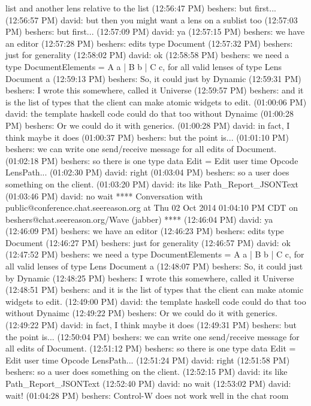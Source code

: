 list and another lens relative to the list
(12:56:47 PM) beshers: but first...
(12:56:57 PM) david: but then you might want a lens on a sublist too
(12:57:03 PM) beshers: but first...
(12:57:09 PM) david: ya
(12:57:15 PM) beshers: we have an editor
(12:57:28 PM) beshers: edits type Document
(12:57:32 PM) beshers: just for generality
(12:58:02 PM) david: ok
(12:58:58 PM) beshers: we need a type DocumentElements = A a | B b | C c, for
all valid lenses of type Lens Document a
(12:59:13 PM) beshers: So, it could just by Dynamic
(12:59:31 PM) beshers: I wrote this somewhere, called it Universe
(12:59:57 PM) beshers: and it is the list of types that the client can make
atomic widgets to edit.
(01:00:06 PM) david: the template haskell code could do that too without
Dynaimc
(01:00:28 PM) beshers: Or we could do it with generics.
(01:00:28 PM) david: in fact, I think maybe it does
(01:00:37 PM) beshers: but the point is...
(01:01:10 PM) beshers: we can write one send/receive message for all edits of
Document.
(01:02:18 PM) beshers: so there is one type data Edit = Edit user time Opcode
LensPath...
(01:02:30 PM) david: right
(01:03:04 PM) beshers: so a user does something on the client.
(01:03:20 PM) david: its like Path_Report_JSONText
(01:03:46 PM) david: no wait
**** Conversation with public@conference.chat.seereason.org at Thu 02 Oct 2014
01:04:10 PM CDT on beshers@chat.seereason.org/Wave (jabber) ****
(12:46:04 PM) david: ya
(12:46:09 PM) beshers: we have an editor
(12:46:23 PM) beshers: edits type Document
(12:46:27 PM) beshers: just for generality
(12:46:57 PM) david: ok
(12:47:52 PM) beshers: we need a type DocumentElements = A a | B b | C c, for
all valid lenses of type Lens Document a
(12:48:07 PM) beshers: So, it could just by Dynamic
(12:48:25 PM) beshers: I wrote this somewhere, called it Universe
(12:48:51 PM) beshers: and it is the list of types that the client can make
atomic widgets to edit.
(12:49:00 PM) david: the template haskell code could do that too without
Dynaimc
(12:49:22 PM) beshers: Or we could do it with generics.
(12:49:22 PM) david: in fact, I think maybe it does
(12:49:31 PM) beshers: but the point is...
(12:50:04 PM) beshers: we can write one send/receive message for all edits of
Document.
(12:51:12 PM) beshers: so there is one type data Edit = Edit user time Opcode
LensPath...
(12:51:24 PM) david: right
(12:51:58 PM) beshers: so a user does something on the client.
(12:52:15 PM) david: its like Path_Report_JSONText
(12:52:40 PM) david: no wait
(12:53:02 PM) david: wait!
(01:04:28 PM) beshers: Control-W does not work well in the chat room
